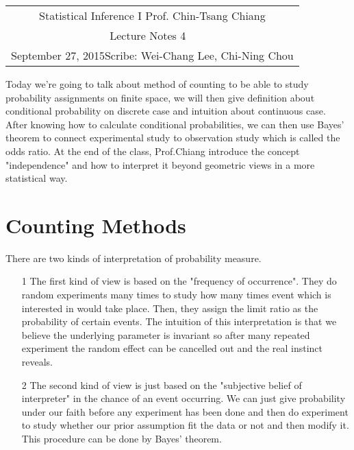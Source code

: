 \documentclass[11pt]{article}
\newcommand{\scribe}{Wei-Chang Lee, Chi-Ning Chou}
\newcommand{\lecnum}{4}
\newcommand{\lecdate}{September 27, 2015}
\begin{document}
	
	\begin{center}
		\renewcommand{\arraystretch}{2}
		\begin{bfseries}
			\begin{tabular}{|c|}
				\hline
				Statistical Inference I \hfill Prof. Chin-Tsang Chiang\\
				\hspace{15em} {\large Lecture Notes \lecnum} \hspace{15em}\ \\
				\lecdate \hfill Scribe: \scribe\\
				\hline
			\end{tabular}
			\renewcommand{\arraystretch}{1}
		\end{bfseries}
	\end{center}
	
Today we're going to talk about method of counting to be able to study probability assignments on finite space, we will then give definition about conditional probability on discrete case and intuition about continuous case. After knowing how to calculate conditional probabilities, we can then use Bayes' theorem to connect experimental study to observation study which is called the odds ratio. At the end of the class, Prof.Chiang introduce the concept "independence" and how to interpret it beyond geometric views in a more statistical way.
\section{Counting Methods}
  There are two kinds of interpretation of probability measure. 
\begin{enumerate}
\item[1]
  The first kind of view is based on the "frequency of occurrence". They do random experiments many times to study  how many times event which is interested in would take place. Then, they assign the limit ratio  as the probability of certain events. The intuition of this interpretation is that we believe the underlying parameter is invariant so after many repeated experiment the random effect can be cancelled out and the real instinct reveals. 
\item[2]
  The second kind of view is just based on the "subjective belief of interpreter" in the chance of an event occurring.  We can just give probability under our faith before any experiment has been done and then do experiment to study whether our prior assumption fit the data or not and then modify it. This procedure can be done by Bayes' theorem. 
\end{enumerate}
\end{document}
